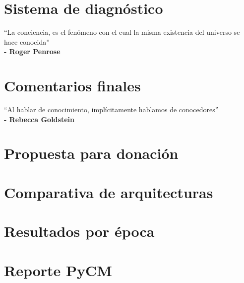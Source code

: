 \documentclass[12pt,oneside,letterpaper]{book}
\begin{document}
\chapter{Sistema de diagnóstico}
\begin{minipage}[t]{0.6\textwidth}
    \begin{flushleft}
        \large
        ``La conciencia, es el fenómeno con el cual la misma existencia del universo se hace conocida'' \\
        \textbf{- Roger Penrose}
    \end{flushleft}
\end{minipage}




\chapter{Comentarios finales}
\begin{minipage}[t]{0.6\textwidth}
    \begin{flushleft}
    \large
    ``Al hablar de conocimiento, implícitamente hablamos de conocedores''\\
    \textbf{- Rebecca Goldstein}
    \end{flushleft}
\end{minipage}

\appendix
\chapter{Propuesta para donación}\label{appendix:grant}


\chapter{Comparativa de arquitecturas}\label{appendix:comparativa}


\chapter{Resultados por época}\label{appendix:entrenamiento}

\chapter{Reporte PyCM}\label{appendix:reporte}

\printbibliography{}
\end{document}
